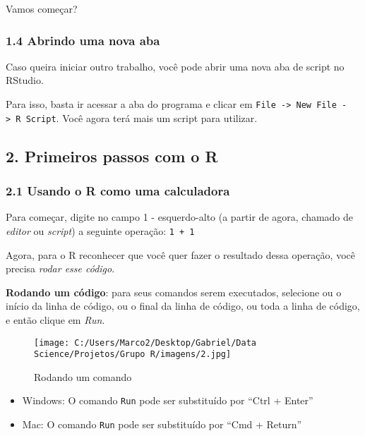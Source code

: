 \documentclass[
]{article}
\providecommand{\tightlist}{%
  \setlength{\itemsep}{0pt}\setlength{\parskip}{0pt}}
\begin{document}
Vamos começar?

\hypertarget{abrindo-uma-nova-aba}{%
\subsubsection{1.4 Abrindo uma nova aba}\label{abrindo-uma-nova-aba}}

Caso queira iniciar outro trabalho, você pode abrir uma nova aba de
script no RStudio.

Para isso, basta ir acessar a aba do programa e clicar em
\texttt{File\ -\textgreater{}\ New\ File\ -\textgreater{}\ R\ Script}.
Você agora terá mais um script para utilizar.

\hypertarget{primeiros-passos-com-o-r}{%
\subsection{2. Primeiros passos com o
R}\label{primeiros-passos-com-o-r}}

\hypertarget{usando-o-r-como-uma-calculadora}{%
\subsubsection{2.1 Usando o R como uma
calculadora}\label{usando-o-r-como-uma-calculadora}}

Para começar, digite no campo 1 - esquerdo-alto (a partir de agora,
chamado de \emph{editor} ou \emph{script}) a seguinte operação:
\texttt{1\ +\ 1}

Agora, para o R reconhecer que você quer fazer o resultado dessa
operação, você precisa \emph{rodar esse código}.

\textbf{Rodando um código}: para seus comandos serem executados,
selecione ou o início da linha de código, ou o final da linha de código,
ou toda a linha de código, e então clique em \emph{Run}.

\begin{figure}
\centering
\texttt{[image: C:/Users/Marco2/Desktop/Gabriel/Data Science/Projetos/Grupo R/imagens/2.jpg]}
\caption{Rodando um comando}
\end{figure}

\begin{itemize}
\tightlist
\item
  Windows: O comando \texttt{Run} pode ser substituído por ``Ctrl +
  Enter''
\item
  Mac: O comando \texttt{Run} pode ser substituído por ``Cmd + Return''
\end{itemize}
\end{document}
